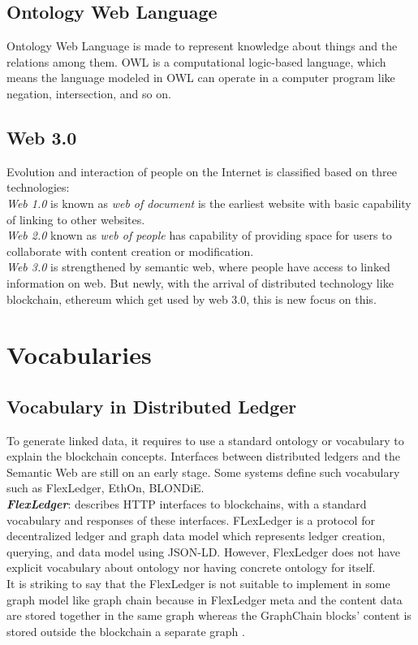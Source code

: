 \subsection{Ontology Web Language }
Ontology Web Language is made to represent knowledge about things and the relations among them. OWL is a computational logic-based language, which means the language modeled in OWL can operate in a computer program like negation, intersection, and so on\cite{Hector}.

\subsection{Web 3.0}\cite{Hector}
Evolution and interaction of people on the Internet is classified based on three technologies:\\
\textit{Web 1.0} is known as \textit{web of document} is the earliest website with basic capability of linking to other websites.\\
\textit{Web 2.0} known as  \textit{web of people} has capability of providing space for users to collaborate with content creation or modification.\\
\textit{Web 3.0} is strengthened by semantic web, where people have access to linked information on web. But newly, with the arrival of distributed technology like blockchain, ethereum which get used by web 3.0, this is new focus on this.
\section{Vocabularies}
\subsection{Vocabulary in Distributed Ledger}
To generate linked data, it requires to use a standard ontology or vocabulary to explain the blockchain concepts. Interfaces between distributed ledgers and the Semantic Web are still on an early stage. Some systems define such vocabulary such as FlexLedger, EthOn, BLONDiE\cite{Third}.\\

\textbf{\textit{FlexLedger}}: describes HTTP interfaces to blockchains, with a standard vocabulary and responses of these interfaces. FLexLedger is a protocol for decentralized ledger and graph data model which represents ledger creation, querying, and data model using JSON-LD. However, FlexLedger does not have explicit vocabulary about ontology nor having concrete ontology for itself. \\
It is striking to say that the FlexLedger is not suitable to implement in some graph model like graph chain because in FlexLedger meta and the content data are stored together in the same graph whereas the GraphChain blocks’ content is stored outside the blockchain a separate graph \cite{Sopek}.\\

